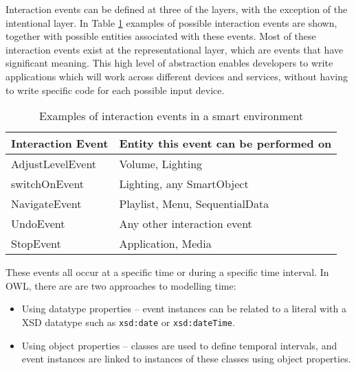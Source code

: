 Interaction events can be defined at three of the layers, with the exception of the intentional layer. In Table \ref{transformationTable} examples of possible interaction events are shown, together with possible entities associated with these events. Most of these interaction events exist at the representational layer, which are events that have significant meaning. This high level of abstraction enables developers to write applications which will work across different devices and services, without having to write specific code for each possible input device.

\begin{table}
\centering
\begin{tabular}{|l|l|}
\hline
Interaction Event & Entity this event can be performed on\\
\hline
AdjustLevelEvent & Volume, Lighting \\
switchOnEvent & Lighting, any SmartObject \\
NavigateEvent & Playlist, Menu, SequentialData \\
UndoEvent & Any other interaction event \\
StopEvent & Application, Media \\
\hline
\end{tabular}
\caption{Examples of interaction events in a smart environment}
\label{transformationTable}
\end{table}







These events all occur at a specific time or during a specific time interval. In \ac{OWL}, there are are two approaches to modelling time:

\begin{itemize}
	\item Using datatype properties -- event instances can be related to a literal with a \ac{XSD} datatype such as \texttt{xsd:date} or \texttt{xsd:dateTime}. %
	\item Using object properties -- classes are used to define temporal intervals, and event instances are linked to instances of these classes using object properties.
\end{itemize}

